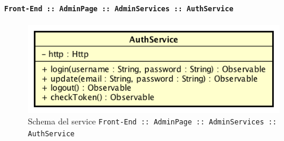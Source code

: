 \documentclass[../DefinizioneDiProdotto_v2.0.0.tex]{subfiles}
\begin{document}
				\newpage
		      	\paragraph{\texttt{Front-End :: AdminPage :: AdminServices :: AuthService}}
		      	\acapo
				\begin{figure}[!h]
					\centering
					\includegraphics[scale=0.6]{Architettura/Front-End/AdminPage/AdminServices/AuthService.png}
					\caption{Schema del service \texttt{Front-End :: AdminPage :: AdminServices :: AuthService}}
				\end{figure}
\end{document}
